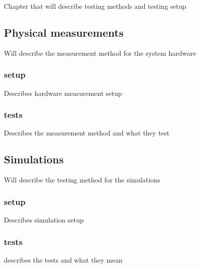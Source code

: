 Chapter that will describe testing methods and testing setup

\subsection{Physical measurements}
Will describe the measurement method for the system hardware

\subsubsection{setup}
Describes hardware measurement setup

\subsubsection{tests}
Describes the measurement method and what they test

\subsection{Simulations}
Will describe the testing method for the simulations

\subsubsection{setup}
Describes simulation setup

\subsubsection{tests}
describes the tests and what they mean
